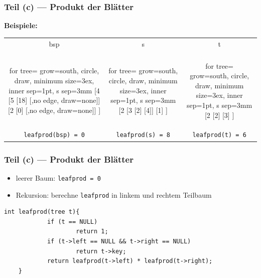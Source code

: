 \documentclass{beamer}
\begin{document}
\begin{frame}[fragile] \frametitle{Teil (c) --- Produkt der Blätter}
	\textbf{Beispiele:}
	
	\begin{center}
		\begin{tabular}{ccc}
			bsp & s & t \\ \\
			\begin{forest}
				for tree={ grow=south, circle, draw, minimum size=3ex, inner sep=1pt, s sep=3mm }
				[4 	[5 [18] [,no edge, draw=none]] [2 [0] [,no edge, draw=none]] ]
			\end{forest}
			&
			\begin{forest}
				for tree={ grow=south, circle, draw, minimum size=3ex, inner sep=1pt, s sep=3mm }
				[2 	[3 [2] [4]] [1] ]
			\end{forest}
			&
			\begin{forest}
				for tree={ grow=south, circle, draw, minimum size=3ex, inner sep=1pt, s sep=3mm }
				[2 	[2] [3] ]
			\end{forest} \\ \pause
			\footnotesize \texttt{leafprod(bsp) = 0} &
			\footnotesize \texttt{leafprod(s) = 8} &
			\footnotesize \texttt{leafprod(t) = 6}
		\end{tabular}
	\end{center}
\end{frame}
\begin{frame}[fragile] \frametitle{Teil (c) --- Produkt der Blätter}
	\begin{itemize}
		\item leerer Baum: \texttt{leafprod = 0}
		\item Rekursion: berechne \texttt{leafprod} in linkem und rechtem Teilbaum
	\end{itemize}
	\pause
	\begin{lstlisting}[style=notebook]
	int leafprod(tree t){
			if (t == NULL)
					return 1;
			if (t->left == NULL && t->right == NULL)
					return t->key;
			return leafprod(t->left) * leafprod(t->right);
	}
	\end{lstlisting}
\end{frame}
\end{document}
